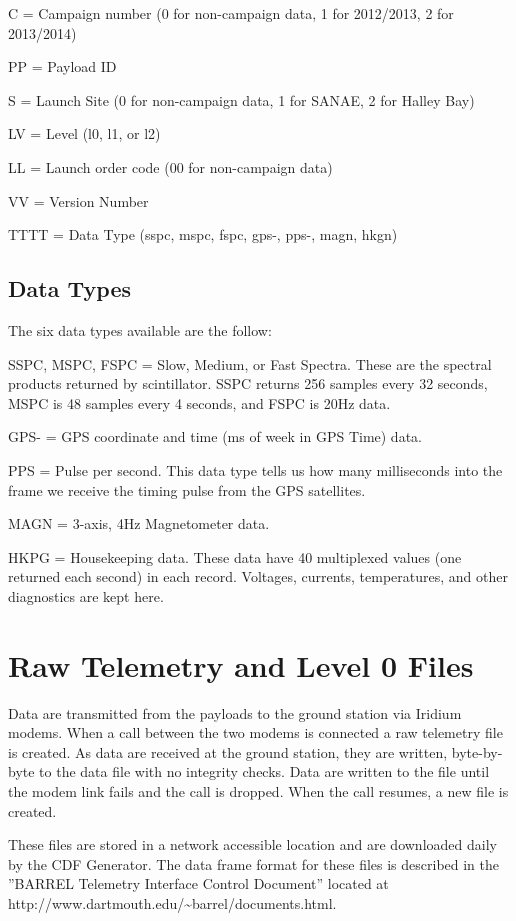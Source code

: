 \documentclass{article}
\begin{document}
C = Campaign number (0 for non-campaign data, 1 for 2012/2013, 2 for 2013/2014)

PP = Payload ID

S = Launch Site (0 for non-campaign data, 1 for SANAE, 2 for Halley Bay)

LV =  Level (l0, l1, or l2)

LL = Launch order code (00 for non-campaign data)

VV = Version Number

TTTT = Data Type (sspc, mspc, fspc, gps-, pps-, magn, hkgn)

\subsection{Data Types}
The six data types available are the follow:

SSPC, MSPC, FSPC = Slow, Medium, or Fast Spectra. These are the spectral products returned by scintillator. SSPC returns 256 samples every 32 seconds, MSPC is 48 samples every 4 seconds, and FSPC is 20Hz data.

GPS- = GPS coordinate and time (ms of week in GPS Time) data. 

PPS = Pulse per second. This data type tells us how many milliseconds into the frame we receive the timing pulse from the GPS satellites.

MAGN = 3-axis, 4Hz Magnetometer data.

HKPG = Housekeeping data. These data have 40 multiplexed values (one returned each second) in each record. Voltages, currents, temperatures, and other diagnostics are kept here.

\section{Raw Telemetry and Level 0 Files}
Data are transmitted from the payloads to the ground station via Iridium modems. When a call between the two modems is connected a raw telemetry file is created. As data are received at the ground station, they are written, byte-by-byte to the data file with no integrity checks. Data are written to the file until the modem link fails and the call is dropped. When the call resumes, a new file is created.

These files are stored in a network accessible location and are downloaded daily by the CDF Generator. The data frame format for these files is described in the ''BARREL Telemetry Interface Control Document'' located at http://www.dartmouth.edu/\~{}barrel/documents.html.
\end{document}
